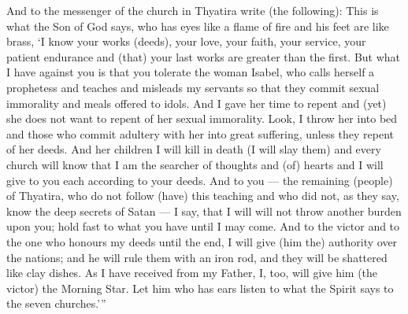 \begin{pages}
\begin{Rightside}
		\pend
		\pstart
			And to the messenger of the church in Thyatira write (the following): This is what the Son of God says, who has eyes like a flame of fire and his feet are like brass, ‘I know your works (deeds), your love, your faith, your service, your patient endurance and (that) your last works are greater than the first.
		\pend
		\pstart
			But what I have against you is that you tolerate the woman Isabel, who calls herself a prophetess and teaches and misleads my servants so that they commit sexual immorality and meals offered to idols. And I gave her time to repent and (yet) she does not want to repent of her sexual immorality. 
		\pend	
		\pstart
			Look, I throw her into bed and those who commit adultery with her into great suffering, unless they repent of her deeds. And her children I will kill in death (I will slay them) and every church will know that I am the searcher of thoughts and (of) hearts and I will give to you each according to your deeds. And to you — the remaining (people) of Thyatira, who do not follow (have) this teaching and who did not, as they say, know the deep secrets of Satan — I say, that I will will not throw another burden upon you; hold fast to what you have until I may come. And to the victor and to the one who honours my deeds until the end, I will give (him the) authority over the nations; and he will rule them with an iron rod, and they will be shattered like clay dishes. As I have received from my Father, I, too, will give him (the victor) the Morning Star. Let him who has ears listen to what the Spirit says to the seven churches.’”
		\pend
        \endnumbering
    \end{Rightside}

\end{pages} 
\Pages